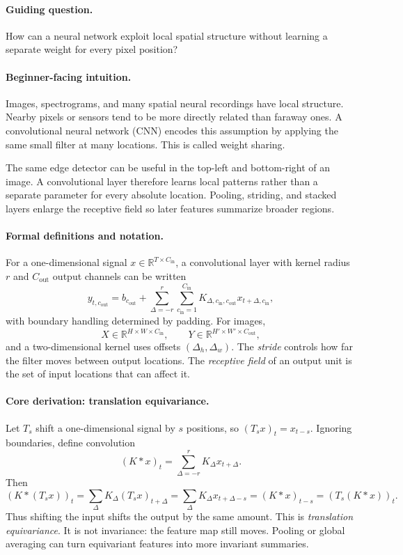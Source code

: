 \paragraph{Guiding question.}
How can a neural network exploit local spatial structure without learning a separate weight for every pixel position?

\paragraph{Beginner-facing intuition.}
Images, spectrograms, and many spatial neural recordings have local structure. Nearby pixels or sensors tend to be more directly related than faraway ones. A convolutional neural network (CNN) encodes this assumption by applying the same small filter at many locations. This is called weight sharing.

The same edge detector can be useful in the top-left and bottom-right of an image. A convolutional layer therefore learns local patterns rather than a separate parameter for every absolute location. Pooling, striding, and stacked layers enlarge the receptive field so later features summarize broader regions.

\paragraph{Formal definitions and notation.}
For a one-dimensional signal \(x\in\mathbb{R}^{T\times C_{\mathrm{in}}}\), a convolutional layer with kernel radius \(r\) and \(C_{\mathrm{out}}\) output channels can be written
\[
y_{t,c_{\mathrm{out}}}
=b_{c_{\mathrm{out}}}
+\sum_{\Delta=-r}^{r}\sum_{c_{\mathrm{in}}=1}^{C_{\mathrm{in}}}
K_{\Delta,c_{\mathrm{in}},c_{\mathrm{out}}}x_{t+\Delta,c_{\mathrm{in}}},
\]
with boundary handling determined by padding. For images,
\[
X\in\mathbb{R}^{H\times W\times C_{\mathrm{in}}},
\qquad
Y\in\mathbb{R}^{H'\times W'\times C_{\mathrm{out}}},
\]
and a two-dimensional kernel uses offsets \((\Delta_h,\Delta_w)\). The \emph{stride} controls how far the filter moves between output locations. The \emph{receptive field} of an output unit is the set of input locations that can affect it.

\paragraph{Core derivation: translation equivariance.}
Let \(T_s\) shift a one-dimensional signal by \(s\) positions, so \((T_s x)_t=x_{t-s}\). Ignoring boundaries, define convolution
\[
(K\ast x)_t=\sum_{\Delta=-r}^{r}K_\Delta x_{t+\Delta}.
\]
Then
\[
(K\ast(T_s x))_t
=\sum_\Delta K_\Delta (T_s x)_{t+\Delta}
=\sum_\Delta K_\Delta x_{t+\Delta-s}
=(K\ast x)_{t-s}
=(T_s(K\ast x))_t.
\]
Thus shifting the input shifts the output by the same amount. This is \emph{translation equivariance}. It is not invariance: the feature map still moves. Pooling or global averaging can turn equivariant features into more invariant summaries.

